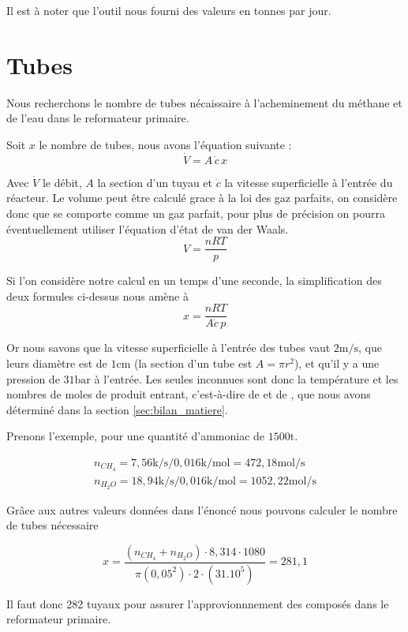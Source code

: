 \documentclass[a4paper, oneside, 12pt]{article}
\begin{document}
Il est à noter que l'outil nous fourni des valeurs en tonnes par jour.

\section{Tubes}

Nous recherchons le nombre de tubes nécaissaire à l'acheminement du 
méthane et de l'eau dans le reformateur primaire.

Soit $x$ le nombre de tubes, nous avons l'équation suivante :
\[
	\dot{V} = A \, \dot{c} \, x
\]

Avec $\dot{V}$ le débit, $A$ la section d'un tuyau 
et $\dot{c}$ la vitesse superficielle à l'entrée du réacteur.
Le volume peut être calculé grace à la loi des gaz parfaits,
on considère donc que  se comporte comme un gaz parfait,
pour plus de précision on pourra éventuellement utiliser l'équation
d'état de van der Waals.
\[
	V = \frac{n R T}{p}
\]

Si l'on considère notre calcul en un temps d'une seconde, 
la simplification des deux formules ci-dessus nous amène à
\[
	x = \frac{n R T}{A \dot{c} \, p}
\]

Or nous savons que la vitesse superficielle à l'entrée des tubes 
vaut $2 \si{\meter\per\second}$,
que leurs diamètre est de $1 \si{\centi\meter}$ 
(la section d'un tube est $A = \pi r^2$),
et qu'il y a une pression de $31 \si{\bar}$ à l'entrée.
Les seules inconnues sont donc la température et les nombres de moles
de produit entrant, c'est-à-dire de  et de ,
que nous avons déterminé dans la section \ref{sec:bilan_matiere}.

Prenons l'exemple, pour une quantité d'ammoniac de $1500 \si{\tonne}$.

\begin{align*}
	n_{CH_{4}} = 7,56 \si{\kilo\per\second} / 0,016 \si{\kilo\per\mole} 
	= 472,18 \si{\mole\per\second} \\
	n_{H_{2}O} = 18,94 \si{\kilo\per\second}/ 0,016 \si{\kilo\per\mole}
	= 1052,22 \si{\mole\per\second}
\end{align*}

Grâce aux autres valeurs données dans l'énoncé 
nous pouvons calculer le nombre de tubes nécessaire 

\[
	x = \frac{(n_{CH_{4}}+n_{H_{2}O}) \cdot 8,314 \cdot1080}
	{\pi(0,05^2) \cdot 2 \cdot (31.10^5)} = 281,1
\]

Il faut donc 282 tuyaux pour assurer l'approvionnnement 
des composés dans le reformateur primaire.
\end{document}

